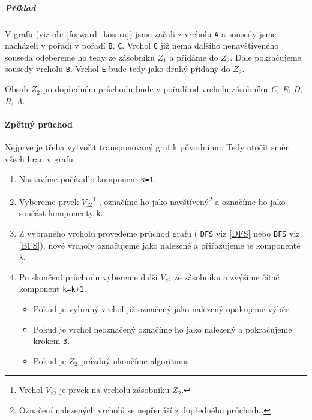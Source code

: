 \documentclass[12pt]{article}
\begin{document}
\subparagraph{Příklad}
V grafu (viz obr.\ref{forward_kosara}) jsme začali z vrcholu \texttt{A} a sousedy jsme nacházeli v pořadí v pořadí \texttt{B}, \texttt{C}. Vrchol \texttt{C} již nemá dalšího nenavštíveného souseda odebereme ho tedy ze zásobníku $Z_1$ a přidáme do $Z_2$. Dále pokračujeme sousedy vrcholu \texttt{B}. Vrchol \texttt{E} bude tedy jako druhý přidaný do $Z_2$. 

Obsah $Z_2$ po dopředném průchodu bude v pořadí od vrcholu zásobníku \textit{C, E, D, B, A}.

\paragraph{Zpětný průchod}
Nejprve je třeba vytvořit transponovaný graf k původnímu. Tedy otočit směr všech hran v grafu.

\begin{enumerate}
\setlength\itemsep{1px}
\item Nastavíme počítadlo komponent \texttt{k=1}.
\item Vybereme prvek $V_{z2}$\footnote{
Vrchol $V_{z2}$ je prvek na vrcholu zásobníku $Z_2$.
} 
, označíme ho jako navštívený\footnote{
Označení nalezených vrcholů se nepřenáší z dopředného průchodu.
} 
a označíme ho jako součást komponenty \texttt{k}.
\item Z vybraného vrcholu provedeme průchod grafu ( \texttt{DFS} viz \ref{DFS} nebo \texttt{BFS} viz \ref{BFS}), nové vrcholy označujeme jako nalezené a přiřazujeme je komponentě \texttt{k}.
\item Po skončení průchodu vybereme další $V_{z2}$ ze zásobníku a zvýšíme čítač komponent \texttt{k=k+1}.
\begin{itemize}
\setlength\itemsep{1px}
\renewcommand\labelitemi{--}
\item Pokud je vybraný vrchol již označený jako nalezený opakujeme výběr.
\item Pokud je vrchol neoznačený označíme ho jako nalezený a pokračujeme krokem \texttt{3}.
\item Pokud je $Z_2$ prázdný ukončíme algoritmus.
\end{itemize}
\end{enumerate}
\end{document}
